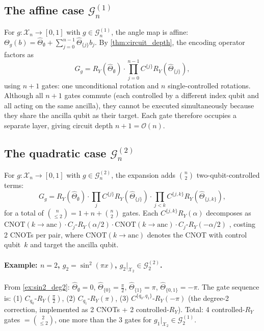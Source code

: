 \documentclass[12pt,a4paper]{article}
\theoremstyle{plain}
\theoremstyle{definition}
\theoremstyle{remark}
\newcommand{\Ry}{R_Y}
\newcommand{\Gclass}[2]{\mathcal{G}_{#1}^{(#2)}}
\newcommand{\cnot}{\mathrm{CNOT}}
\begin{document}
\subsection{The affine case $\Gclass{n}{1}$}

For $g:\mathcal{X}_n\to[0,1]$ with $g\in\Gclass{n}{1}$, the angle map is affine:
$\Theta_g(b)=\hat\Theta_\emptyset+\sum_{j=0}^{n-1}\hat\Theta_{\{j\}}b_j$.
By \cref{thm:circuit_depth}, the encoding operator factors as
\begin{equation}
  G_g = \Ry(\hat\Theta_\emptyset)\cdot
        \prod_{j=0}^{n-1}C^{\{j\}}\Ry(\hat\Theta_{\{j\}}),
  \label{eq:Gg_affine}
\end{equation}
using $n+1$ gates: one unconditional rotation and $n$ single-controlled
rotations.
Although all $n+1$ gates commute (each controlled by a different index
qubit and all acting on the same ancilla), they cannot be executed
simultaneously because they share the ancilla qubit as their target.
Each gate therefore occupies a separate layer, giving circuit depth
$n+1 = \mathcal{O}(n)$.

\subsection{The quadratic case $\Gclass{n}{2}$}

For $g:\mathcal{X}_n\to[0,1]$ with $g\in\Gclass{n}{2}$, the expansion adds $\binom{n}{2}$
two-qubit-controlled terms:
\begin{equation}
  G_g = \Ry(\hat\Theta_\emptyset)\cdot
        \prod_j C^{\{j\}}\Ry(\hat\Theta_{\{j\}})\cdot
        \prod_{j<k}C^{\{j,k\}}\Ry(\hat\Theta_{\{j,k\}}),
  \label{eq:Gg_quadratic}
\end{equation}
for a total of $\binom{n}{\leq 2}=1+n+\binom{n}{2}$ gates.
Each $C^{\{j,k\}}\Ry(\alpha)$ decomposes as
$\cnot(k\to\mathrm{anc})\cdot C_j$-$\Ry(\alpha/2)\cdot
\cnot(k\to\mathrm{anc})\cdot C_j$-$\Ry(-\alpha/2)$
\cite{BarencoEtAl1995}, costing 2 CNOTs per pair,
where $\cnot(k\to\mathrm{anc})$ denotes the CNOT with control qubit~$k$
and target the ancilla qubit.

\paragraph{Example: $n=2$, $g_2=\sin^2(\pi x)$, $g_2|_{\mathcal{X}_2}\in\Gclass{2}{2}$.}
From \cref{ex:sin2_deg2}: $\hat\Theta_\emptyset=0$,
$\hat\Theta_{\{0\}}=\tfrac{\pi}{2}$,
$\hat\Theta_{\{1\}}=\pi$,
$\hat\Theta_{\{0,1\}}=-\pi$.
The gate sequence is:
(1) $C_{q_0}$-$\Ry(\tfrac{\pi}{2})$,
(2) $C_{q_1}$-$\Ry(\pi)$,
(3) $C^{\{q_0,q_1\}}$-$\Ry(-\pi)$ (the degree-2 correction,
    implemented as 2 CNOTs + 2 controlled-$\Ry$).
Total: 4 controlled-$\Ry$ gates $=\binom{2}{\leq 2}$, one more than
the 3 gates for $g_1|_{\mathcal{X}_2}\in\Gclass{2}{1}$.
\end{document}
